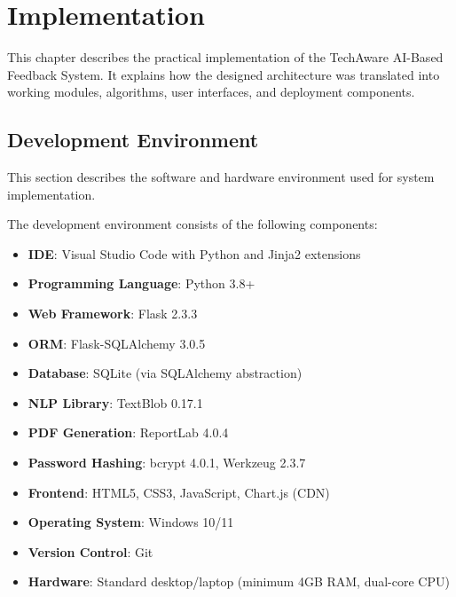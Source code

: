 \chapter{Implementation}

This chapter describes the practical implementation of the TechAware AI-Based Feedback System. 
It explains how the designed architecture was translated into working modules, 
algorithms, user interfaces, and deployment components.


\section{Development Environment}

This section describes the software and hardware environment used 
for system implementation.

The development environment consists of the following components:

\begin{itemize}
    \item \textbf{IDE}: Visual Studio Code with Python and Jinja2 extensions
    \item \textbf{Programming Language}: Python 3.8+
    \item \textbf{Web Framework}: Flask 2.3.3
    \item \textbf{ORM}: Flask-SQLAlchemy 3.0.5
    \item \textbf{Database}: SQLite (via SQLAlchemy abstraction)
    \item \textbf{NLP Library}: TextBlob 0.17.1
    \item \textbf{PDF Generation}: ReportLab 4.0.4
    \item \textbf{Password Hashing}: bcrypt 4.0.1, Werkzeug 2.3.7
    \item \textbf{Frontend}: HTML5, CSS3, JavaScript, Chart.js (CDN)
    \item \textbf{Operating System}: Windows 10/11
    \item \textbf{Version Control}: Git
    \item \textbf{Hardware}: Standard desktop/laptop (minimum 4GB RAM, dual-core CPU)
\end{itemize}

